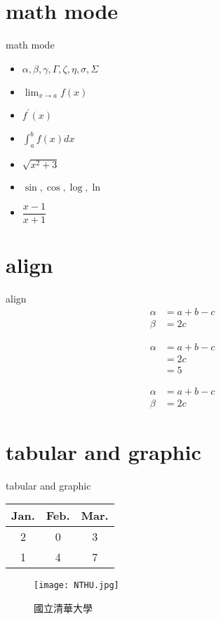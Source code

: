 \documentclass[12pt]{beamer}
\begin{document}
\section{math mode}
\begin{frame}{math mode}
	\begin{itemize}
		\item $ \alpha, \beta, \gamma, \Gamma, \zeta, \eta, \sigma, \Sigma $
		\item $ \displaystyle \lim_{x \to a} f(x) $
		\item $ f^\prime(x) $
		\item $ \displaystyle \int_a^b f(x) dx $
		\item $ \sqrt{x^2+3} $
		\item $ \sin, \cos, \log, \ln $
		\item $ \dfrac{x-1}{x+1} $
	\end{itemize}
\end{frame}

\section{align}
\begin{frame}{align}
	\begin{align}
		\alpha &= a + b - c \\
		\beta  &= 2c
	\end{align}

	\begin{align*}
		\alpha &= a + b - c \\
			   &= 2c \\
			   &= 5
	\end{align*}

	\begin{equation} \begin{split}
		\alpha &= a + b - c \\
		\beta  &= 2c
	\end{split} \end{equation}
\end{frame}

\section{tabular and graphic}
\begin{frame}{tabular and graphic}
\begin{center}  %
\begin{tabular}{ccc}
	\toprule[2pt]
	Jan. & Feb. & Mar. \\
	\midrule[1pt]
	2 & 0 & 3 \\
	1 & 4 & 7 \\
	\bottomrule[2pt]
\end{tabular}
\end{center}

\begin{figure}[ht]
\begin{center}
\texttt{[image: NTHU.jpg]}
\caption{國立清華大學}
\end{center}
\end{figure}
\end{frame}
\end{document}

